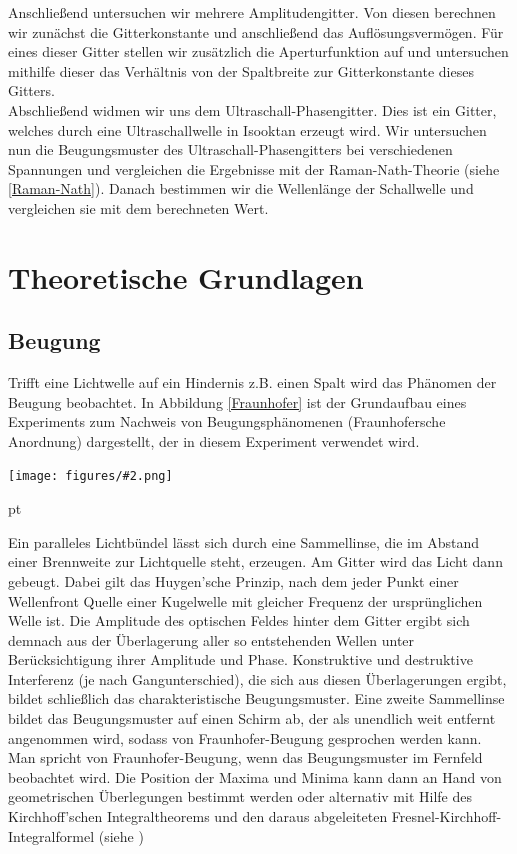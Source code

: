 \documentclass[12pt]{article}
\newcommand{\gra}[3][0.7]{
	\begin{minipage}[h!]{\textwidth}
		\centering
		\texttt{[image: figures/\#2.png]}
		\captionof{figure}{#3}
	\end{minipage}
	\vskip 30 pt
}
\begin{document}
Anschließend untersuchen wir mehrere Amplitudengitter. Von diesen berechnen wir zunächst die Gitterkonstante und anschließend das Auflösungsvermögen. Für eines dieser Gitter stellen wir zusätzlich die Aperturfunktion auf und untersuchen mithilfe dieser das Verhältnis von der Spaltbreite zur Gitterkonstante dieses Gitters.\\

Abschließend widmen wir uns dem Ultraschall-Phasengitter. Dies ist ein Gitter, welches durch eine Ultraschallwelle in Isooktan erzeugt wird. Wir untersuchen nun die Beugungsmuster des Ultraschall-Phasengitters bei verschiedenen Spannungen und vergleichen die Ergebnisse mit der Raman-Nath-Theorie (siehe \ref{Raman-Nath}). Danach bestimmen wir die Wellenlänge der Schallwelle und vergleichen sie mit dem berechneten Wert.



\newpage
\section{Theoretische Grundlagen}

\subsection{Beugung}

Trifft eine Lichtwelle auf ein Hindernis z.B. einen Spalt wird das Phänomen der Beugung beobachtet. In Abbildung \ref{Fraunhofer} ist  der Grundaufbau eines Experiments zum Nachweis von Beugungsphänomenen (Fraunhofersche Anordnung) dargestellt, der in diesem Experiment verwendet wird. 

\gra{Fraunhofer}{Fraunhofersche Anordnung \label{Fraunhofer}}   

Ein paralleles Lichtbündel lässt sich durch eine Sammellinse, die im Abstand einer Brennweite zur Lichtquelle steht, erzeugen. Am Gitter wird das Licht dann gebeugt. Dabei gilt das Huygen'sche Prinzip, nach dem jeder Punkt einer Wellenfront Quelle einer Kugelwelle mit gleicher Frequenz der ursprünglichen Welle ist. Die Amplitude des optischen Feldes hinter dem Gitter ergibt sich demnach aus der Überlagerung aller so entstehenden Wellen unter Berücksichtigung ihrer Amplitude und Phase. Konstruktive und destruktive Interferenz (je nach Gangunterschied), die sich aus diesen Überlagerungen ergibt, bildet schließlich das charakteristische Beugungsmuster. Eine zweite Sammellinse bildet das Beugungsmuster auf einen Schirm ab, der als unendlich weit entfernt angenommen wird, sodass von Fraunhofer-Beugung gesprochen werden kann. Man spricht von Fraunhofer-Beugung, wenn das Beugungsmuster im Fernfeld beobachtet wird. Die Position der Maxima und Minima kann dann an Hand von geometrischen Überlegungen bestimmt werden oder alternativ mit Hilfe des Kirchhoff'schen Integraltheorems und den daraus abgeleiteten Fresnel-Kirchhoff-Integralformel (siehe \label{Fourier})
\end{document}
